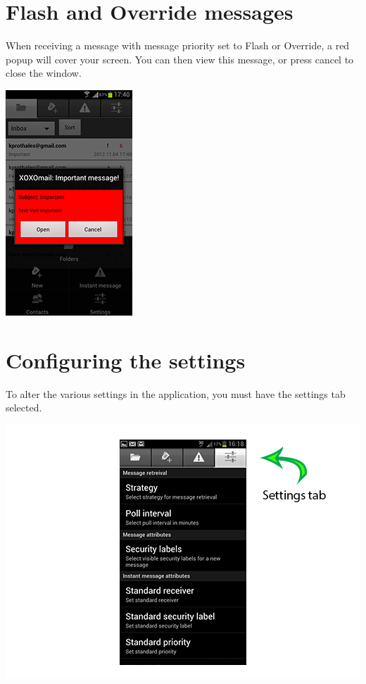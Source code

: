 \newpage
\section*{Flash and Override messages}




When receiving a message with message priority set to Flash or Override, a red popup will cover your screen. You can then view this message, or press cancel to close the window.

 \begin{center}
    \includegraphics{FLASH}
  \end{center}


\newpage
\section*{Configuring the settings}

To alter the various settings in the application, you must have the settings tab selected.
 \begin{center}
    \includegraphics{settingsarrow}
  \end{center}

